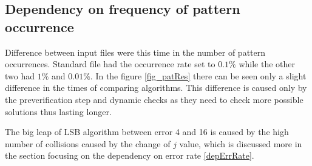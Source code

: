 \subsection{Dependency on frequency of pattern occurrence}
Difference between input files were this time in the number of pattern occurrences. Standard file had the occurrence rate set to $0.1 \%$ while the other two had $1 \%$ and $0.01 \%$. In the figure \ref{fig_patRes} there can be seen only a slight difference in the times of comparing algorithms. This difference is caused only by the preverification step and dynamic checks as they need to check more possible solutions thus lasting longer.

The big leap of LSB algorithm between error 4 and 16 is caused by the high number of collisions caused by the change of $j$ value, which is discussed more in the section focusing on the dependency on error rate \ref{depErrRate}.

